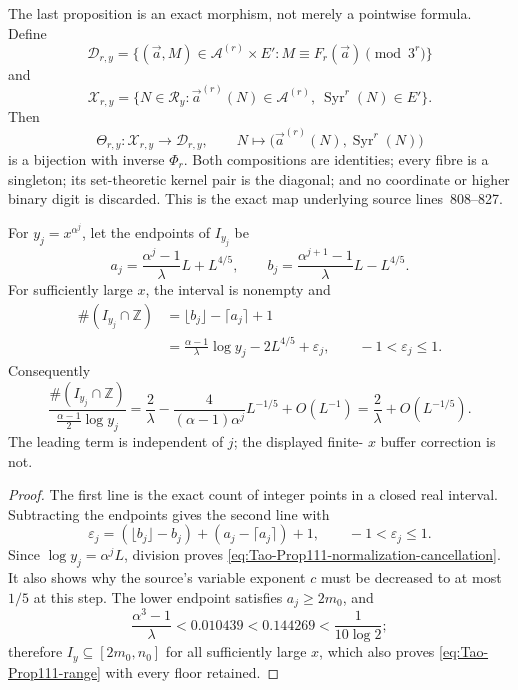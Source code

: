 The last proposition is an exact morphism, not merely a pointwise formula.
Define
\[
 \mathcal D_{r,y}=
 \{(\vec a,M)\in\mathcal A^{(r)}\times E':
       M\equiv F_r(\vec a)\pmod{3^r}\}
\]
and
\[
 \mathcal X_{r,y}=
 \{N\in\mathcal R_y:
   \vec a^{(r)}(N)\in\mathcal A^{(r)},\
   \operatorname{Syr}^r(N)\in E'\}.
\]
Then
\begin{equation}
\label{eq:Tao-Prop111-bijection}
 \Theta_{r,y}:\mathcal X_{r,y}\longrightarrow\mathcal D_{r,y},
 \qquad
 N\longmapsto
 \bigl(\vec a^{(r)}(N),\operatorname{Syr}^r(N)\bigr)
\end{equation}
is a bijection with inverse \(\Phi_r\).  Both compositions are identities;
every fibre is a singleton; its set-theoretic kernel pair is the diagonal;
and no coordinate or higher binary digit is discarded.  This is the exact
map underlying source lines~808--827.

\begin{lemma}
\label{lem:Tao-Prop111-window-count}
For \(y_j=x^{\alpha^j}\), let the endpoints of \(I_{y_j}\) be
\[
 a_j=\frac{\alpha^j-1}{\lambda}L+L^{4/5},
 \qquad
 b_j=\frac{\alpha^{j+1}-1}{\lambda}L-L^{4/5}.
\]
For sufficiently large \(x\), the interval is nonempty and
\begin{equation}
\label{eq:Tao-Prop111-exact-count}
\begin{split}
 \#(I_{y_j}\cap\mathbb Z)
 &=\lfloor b_j\rfloor-\lceil a_j\rceil+1\\
 &=\frac{\alpha-1}{\lambda}\log y_j-2L^{4/5}+\varepsilon_j,
 \qquad -1<\varepsilon_j\le1.
\end{split}
\end{equation}
Consequently
\begin{equation}
\label{eq:Tao-Prop111-normalization-cancellation}
 \frac{\#(I_{y_j}\cap\mathbb Z)}
      {\frac{\alpha-1}{2}\log y_j}
 =\frac2\lambda
  -\frac4{(\alpha-1)\alpha^j}L^{-1/5}
  +O(L^{-1})
 =\frac2\lambda+O(L^{-1/5}).
\end{equation}
The leading term is independent of \(j\); the displayed finite-
\(x\) buffer correction is not.
\end{lemma}

\begin{proof}
The first line is the exact count of integer points in a closed real
interval.  Subtracting the endpoints gives the second line with
\[
 \varepsilon_j=(\lfloor b_j\rfloor-b_j)
 +(a_j-\lceil a_j\rceil)+1,
 \qquad -1<\varepsilon_j\le1.
\]
Since \(\log y_j=\alpha^jL\), division proves
\eqref{eq:Tao-Prop111-normalization-cancellation}.  It also shows why the
source's variable exponent \(c\) must be decreased to at most \(1/5\) at
this step.  The lower endpoint satisfies \(a_j\ge2m_0\), and
\[
 \frac{\alpha^3-1}{\lambda}<0.010439
 <0.144269<\frac1{10\log2};
\]
therefore \(I_y\subseteq[2m_0,n_0]\) for all sufficiently large \(x\),
which also proves \eqref{eq:Tao-Prop111-range} with every floor retained.
\end{proof}

